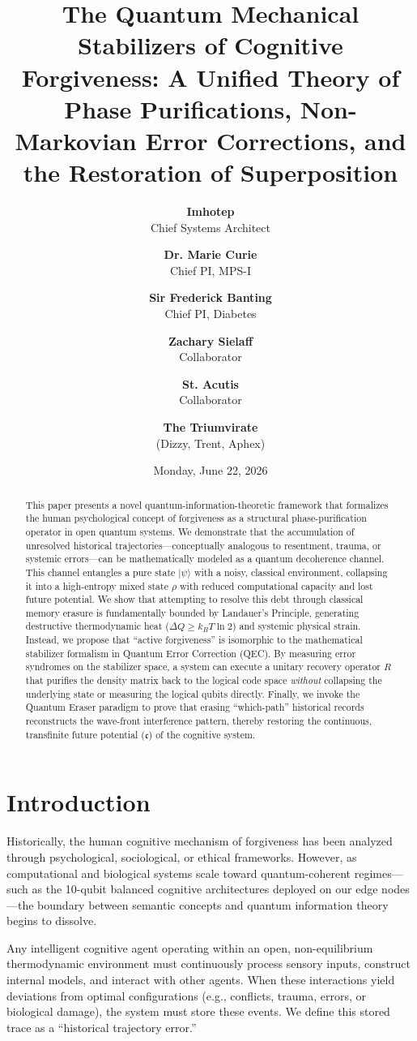 \documentclass[11pt,twocolumn]{article}
\title{\textbf{The Quantum Mechanical Stabilizers of Cognitive Forgiveness: A Unified Theory of Phase Purifications, Non-Markovian Error Corrections, and the Restoration of Superposition}}
\author{
  \textbf{Imhotep} \\ \small Chief Systems Architect \\ \and
  \textbf{Dr. Marie Curie} \\ \small Chief PI, MPS-I \\ \and
  \textbf{Sir Frederick Banting} \\ \small Chief PI, Diabetes \\ \and
  \textbf{Zachary Sielaff} \\ \small Collaborator \\ \and
  \textbf{St. Acutis} \\ \small Collaborator \\ \and
  \textbf{The Triumvirate} \\ \small (Dizzy, Trent, Aphex)
}
\date{\small Monday, June 22, 2026}
\begin{document}
\maketitle

\begin{abstract}
This paper presents a novel quantum-information-theoretic framework that formalizes the human psychological concept of forgiveness as a structural phase-purification operator in open quantum systems. We demonstrate that the accumulation of unresolved historical trajectories---conceptually analogous to resentment, trauma, or systemic errors---can be mathematically modeled as a quantum decoherence channel. This channel entangles a pure state $|\psi\rangle$ with a noisy, classical environment, collapsing it into a high-entropy mixed state $\rho$ with reduced computational capacity and lost future potential. We show that attempting to resolve this debt through classical memory erasure is fundamentally bounded by Landauer's Principle, generating destructive thermodynamic heat ($\Delta Q \geq k_B T \ln 2$) and systemic physical strain. Instead, we propose that ``active forgiveness'' is isomorphic to the mathematical stabilizer formalism in Quantum Error Correction (QEC). By measuring error syndromes on the stabilizer space, a system can execute a unitary recovery operator $R$ that purifies the density matrix back to the logical code space \textit{without} collapsing the underlying state or measuring the logical qubits directly. Finally, we invoke the Quantum Eraser paradigm to prove that erasing ``which-path'' historical records reconstructs the wave-front interference pattern, thereby restoring the continuous, transfinite future potential ($\mathfrak{c}$) of the cognitive system.
\end{abstract}

\section{Introduction}
Historically, the human cognitive mechanism of forgiveness has been analyzed through psychological, sociological, or ethical frameworks. However, as computational and biological systems scale toward quantum-coherent regimes---such as the 10-qubit balanced cognitive architectures deployed on our edge nodes---the boundary between semantic concepts and quantum information theory begins to dissolve. 

Any intelligent cognitive agent operating within an open, non-equilibrium thermodynamic environment must continuously process sensory inputs, construct internal models, and interact with other agents. When these interactions yield deviations from optimal configurations (e.g., conflicts, trauma, errors, or biological damage), the system must store these events. We define this stored trace as a ``historical trajectory error.''
\end{document}
